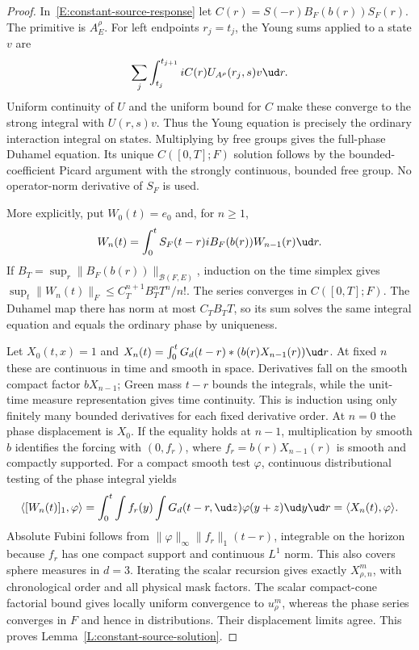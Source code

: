 \begin{proof}
  In~\eqref{E:constant-source-response} let
  $C(r)=S(-r)B_F(b(r))S_F(r)$. The primitive is $A_E^\rho$.
  For left endpoints $r_j=t_j$, the Young sums applied to a state $v$
  are
  \[
    \sum_j\int_{t_j}^{t_{j+1}}iC(r)U_{A^\rho}(r_j,s)v\ud r.
  \]
  Uniform continuity of $U$ and the uniform bound for $C$ make these
  converge to the strong integral with $U(r,s)v$.
  Thus the Young equation is precisely the ordinary interaction
  integral on states. Multiplying by free groups gives the full-phase
  Duhamel equation. Its unique $C([0,T];F)$ solution follows by the
  bounded-coefficient Picard argument with the strongly continuous,
  bounded free group. No operator-norm derivative of $S_F$ is used.

  More explicitly, put $W_0(t)=e_0$ and, for $n\ge1$,
  \[
    W_n(t)=\int_0^t S_F(t-r)iB_F(b(r))W_{n-1}(r)\ud r.
  \]
  If $B_T=\sup_r\|B_F(b(r))\|_{\mathcal B(F,E)}$, induction on the
  time simplex gives
  $\sup_t\|W_n(t)\|_F\le C_T^{n+1}B_T^nT^n/n!$.
  The series converges in $C([0,T];F)$. The Duhamel map there has norm
  at most $C_TB_TT$, so its sum solves the same integral equation and
  equals the ordinary phase by uniqueness.

  Let $X_0(t,x)=1$ and
  $X_n(t)=\int_0^tG_d(t-r)*(b(r)X_{n-1}(r))\ud r$.
  At fixed $n$ these are continuous in time and smooth in space.
  Derivatives fall on the smooth compact factor $bX_{n-1}$;
  Green mass $t-r$ bounds the integrals, while the unit-time measure
  representation gives time continuity. This is induction using only
  finitely many bounded derivatives for each fixed derivative order.
  At $n=0$ the phase displacement is $X_0$. If the equality holds at
  $n-1$, multiplication by smooth $b$ identifies the forcing with
  $(0,f_r)$, where $f_r=b(r)X_{n-1}(r)$ is smooth and compactly supported.
  For a compact smooth test $\varphi$, continuous distributional testing
  of the phase integral yields
  \[
    \langle[W_n(t)]_1,\varphi\rangle
    =\int_0^t\int f_r(y)
    \int G_d(t-r,\ud z)\varphi(y+z)\ud y\ud r
    =\langle X_n(t),\varphi\rangle.
  \]
  Absolute Fubini follows from
  $\|\varphi\|_\infty\|f_r\|_1(t-r)$, integrable on the horizon
  because $f_r$ has one compact support and continuous $L^1$ norm.
  This also covers sphere measures in $d=3$.
  Iterating the scalar recursion gives exactly $X_{\rho,n}^m$,
  with chronological order and all physical mask factors.
  The scalar compact-cone factorial bound gives locally uniform
  convergence to $u_\rho^m$, whereas the phase series converges in
  $F$ and hence in distributions. Their displacement limits agree.
  This proves Lemma~\ref{L:constant-source-solution}.
\end{proof}

